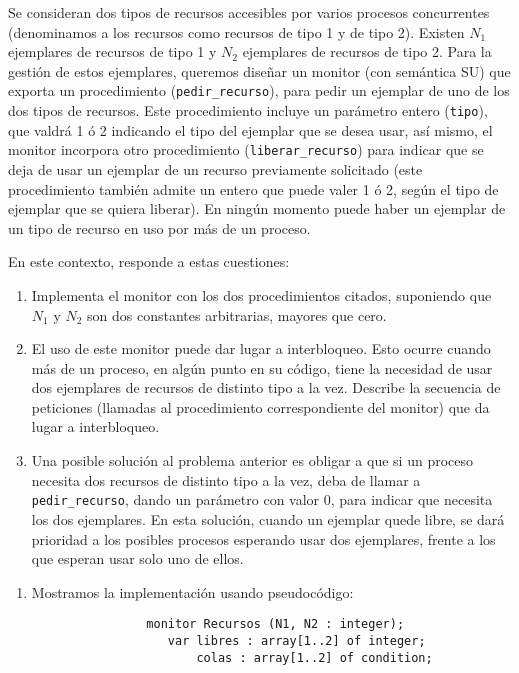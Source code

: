 \begin{ejercicio}
    Se consideran dos tipos de recursos accesibles por varios procesos concurrentes (denominamos a los recursos como recursos de tipo 1 y de tipo 2). Existen $N_1$ ejemplares de recursos de tipo 1 y $N_2$ ejemplares de recursos de tipo 2. Para la gestión de estos ejemplares, queremos diseñar un monitor (con semántica SU) que exporta un procedimiento (\verb|pedir_recurso|), para pedir un ejemplar de uno de los dos tipos de recursos. Este procedimiento incluye un parámetro entero (\verb|tipo|), que valdrá 1 ó 2 indicando el tipo del ejemplar que se desea usar, así mismo, el monitor incorpora otro procedimiento (\verb|liberar_recurso|) para indicar que se deja de usar un ejemplar de un recurso previamente solicitado (este procedimiento también admite un entero que puede valer 1 ó 2, según el tipo de ejemplar que se quiera liberar). En ningún momento puede haber un ejemplar de un tipo de recurso en uso por más de un proceso.

    En este contexto, responde a estas cuestiones:
    \begin{enumerate}
        \item Implementa el monitor con los dos procedimientos citados, suponiendo que $N_1$ y $N_2$ son dos constantes arbitrarias, mayores que cero.
        \item El uso de este monitor puede dar lugar a interbloqueo. Esto ocurre cuando más de un proceso, en algún punto en su código, tiene la necesidad de usar dos ejemplares de recursos de distinto tipo a la vez. Describe la secuencia de peticiones (llamadas al procedimiento correspondiente del monitor) que da lugar a interbloqueo.
        \item Una posible solución al problema anterior es obligar a que si un proceso necesita dos recursos de distinto tipo a la vez, deba de llamar a \verb|pedir_recurso|, dando un parámetro con valor 0, para indicar que necesita los dos ejemplares. En esta solución, cuando un ejemplar quede libre, se dará prioridad a los posibles procesos esperando usar dos ejemplares, frente a los que esperan usar solo uno de ellos.
    \end{enumerate}

    \begin{enumerate}
        \item Mostramos la implementación usando pseudocódigo:
            \begin{verbatim}
                monitor Recursos (N1, N2 : integer);
                   var libres : array[1..2] of integer;
                       colas : array[1..2] of condition;


\end{verbatim}
\end{enumerate}
\end{ejercicio}
